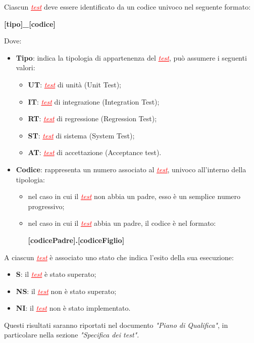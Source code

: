 Ciascun \textcolor{red}{\uline{\textit{test}}} deve essere identificato da un codice univoco nel seguente formato:
\begin{center}
    \textbf{[tipo]\_[codice]}
\end{center}
Dove:
\begin{itemize}
    \item \textbf{Tipo}: indica la tipologia di appartenenza del \textcolor{red}{\uline{\textit{test}}}, può assumere i seguenti valori:
        \begin{itemize}
            \item \textbf{UT}: \textcolor{red}{\uline{\textit{test}}} di unità (Unit Test);
            \item \textbf{IT}: \textcolor{red}{\uline{\textit{test}}} di integrazione (Integration Test);
            \item \textbf{RT}: \textcolor{red}{\uline{\textit{test}}} di regressione (Regression Test);
            \item \textbf{ST}: \textcolor{red}{\uline{\textit{test}}} di sistema (System Test);
            \item \textbf{AT}: \textcolor{red}{\uline{\textit{test}}} di accettazione (Acceptance test).
        \end{itemize}
    \item \textbf{Codice}: rappresenta un numero associato al \textcolor{red}{\uline{\textit{test}}}, univoco all'interno della tipologia:
        \begin{itemize}
            \item nel caso in cui il \textcolor{red}{\uline{\textit{test}}} non abbia un padre, esso è un semplice numero progressivo;
            \item nel caso in cui il \textcolor{red}{\uline{\textit{test}}} abbia un padre, il codice è nel formato:
            \begin{center}
                \textbf{[codicePadre].[codiceFiglio]}
            \end{center}
        \end{itemize}
\end{itemize}

A ciascun \textcolor{red}{\uline{\textit{test}}} è associato uno stato che indica l'esito della sua esecuzione:
\begin{itemize}
    \item \textbf{S}: il \textcolor{red}{\uline{\textit{test}}} è stato superato;
    \item \textbf{NS}: il \textcolor{red}{\uline{\textit{test}}} non è stato superato;
    \item \textbf{NI}: il \textcolor{red}{\uline{\textit{test}}} non è stato implementato.
\end{itemize}
Questi risultati saranno riportati nel documento \textit{"Piano di Qualifica"}, in particolare nella sezione \textit{"Specifica dei test"}.

